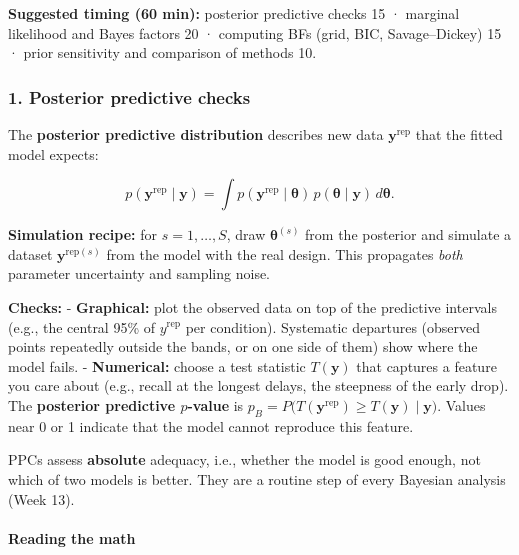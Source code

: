 \textbf{Suggested timing (60 min):} posterior predictive checks 15 ·
marginal likelihood and Bayes factors 20 · computing BFs (grid, BIC,
Savage--Dickey) 15 · prior sensitivity and comparison of methods 10.

\subsubsection{1. Posterior predictive checks}

The \textbf{posterior predictive distribution} describes new data
\(\mathbf{y}^{\text{rep}}\) that the fitted model expects:

\[
p(\mathbf{y}^{\text{rep}} \mid \mathbf{y}) = \int p(\mathbf{y}^{\text{rep}} \mid \boldsymbol\theta)\, p(\boldsymbol\theta \mid \mathbf{y})\, d\boldsymbol\theta.
\]

\textbf{Simulation recipe:} for \(s = 1, \dots, S\), draw
\(\boldsymbol\theta^{(s)}\) from the posterior and simulate a dataset
\(\mathbf{y}^{\text{rep}(s)}\) from the model with the real design. This
propagates \emph{both} parameter uncertainty and sampling noise.

\textbf{Checks:} - \textbf{Graphical:} plot the observed data on top of
the predictive intervals (e.g., the central 95\% of \(y^{\text{rep}}\)
per condition). Systematic departures (observed points repeatedly
outside the bands, or on one side of them) show where the model fails. -
\textbf{Numerical:} choose a test statistic \(T(\mathbf{y})\) that
captures a feature you care about (e.g., recall at the longest delays,
the steepness of the early drop). The \textbf{posterior predictive
\(p\)-value} is
\(p_B = P\big(T(\mathbf{y}^{\text{rep}}) \ge T(\mathbf{y}) \mid \mathbf{y}\big)\).
Values near 0 or 1 indicate that the model cannot reproduce this
feature.

PPCs assess \textbf{absolute} adequacy, i.e., whether the model is good
enough, not which of two models is better. They are a routine step of
every Bayesian analysis (Week 13).

\paragraph{Reading the math}

